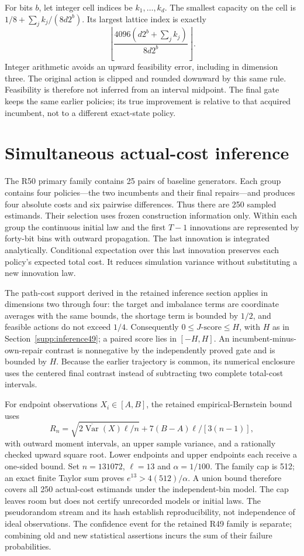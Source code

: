 For bits $b$, let integer cell indices be $k_1,\ldots,k_d$. The smallest capacity on the cell is $1/8+\sum_jk_j/(8d2^b)$. Its largest lattice index is exactly
\[
 \left\lfloor\frac{4096(d2^b+\sum_jk_j)}{8d2^b}\right\rfloor.
\]
Integer arithmetic avoids an upward feasibility error, including in dimension three. The original action is clipped and rounded downward by this same rule. Feasibility is therefore not inferred from an interval midpoint. The final gate keeps the same earlier policies; its true improvement is relative to that acquired incumbent, not to a different exact-state policy.

\section{Simultaneous actual-cost inference}\label{supp:inference50}
The R50 primary family contains 25 pairs of baseline generators. Each group contains four policies---the two incumbents and their final repairs---and produces four absolute costs and six pairwise differences. Thus there are 250 sampled estimands. Their selection uses frozen construction information only. Within each group the continuous initial law and the first $T-1$ innovations are represented by forty-bit bins with outward propagation. The last innovation is integrated analytically. Conditional expectation over this last innovation preserves each policy's expected total cost. It reduces simulation variance without substituting a new innovation law.

The path-cost support derived in the retained inference section applies in dimensions two through four: the target and imbalance terms are coordinate averages with the same bounds, the shortage term is bounded by $1/2$, and feasible actions do not exceed $1/4$. Consequently $0\le J\text{-score}\le H$, with $H$ as in Section~\ref{supp:inference49}; a paired score lies in $[-H,H]$. An incumbent-minus-own-repair contrast is nonnegative by the independently proved gate and is bounded by $H$. Because the earlier trajectory is common, its numerical enclosure uses the centered final contrast instead of subtracting two complete total-cost intervals.

For endpoint observations $X_i\in[A,B]$, the retained empirical-Bernstein bound uses
\[
 R_n=\sqrt{2\overline{\operatorname{Var}}(X)\ell/n}
       +7(B-A)\ell/[3(n-1)],
\]
with outward moment intervals, an upper sample variance, and a rationally checked upward square root. Lower endpoints and upper endpoints each receive a one-sided bound. Set $n=131072$, $\ell=13$ and $\alpha=1/100$. The family cap is 512; an exact finite Taylor sum proves $e^{13}>4(512)/\alpha$. A union bound therefore covers all 250 actual-cost estimands under the independent-bin model. The cap leaves room but does not certify unrecorded models or initial laws. The pseudorandom stream and its hash establish reproducibility, not independence of ideal observations. The confidence event for the retained R49 family is separate; combining old and new statistical assertions incurs the sum of their failure probabilities.

